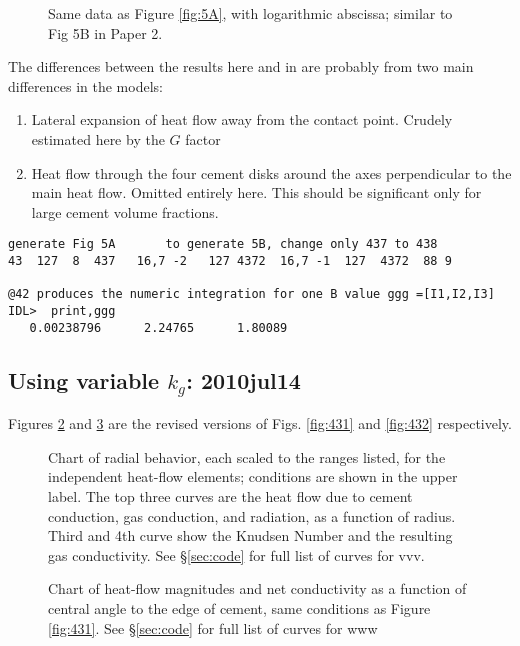 \documentclass{article}
\begin{document}
\begin{figure}[!h] 
\caption{Same data as Figure \ref{fig:5A}, with logarithmic abscissa; similar to
Fig 5B in Paper 2.}
\label{fig:5B}
\end{figure}
 The differences between the results here and in \cite{Piqueux09b} are probably from two main differences in the models: \begin{enumerate}
\item Lateral expansion of heat flow away from the contact point. Crudely estimated here by the $G$ factor
\item Heat flow through the four cement disks around the axes perpendicular to the main heat flow. Omitted entirely here. This should be significant only for large cement volume fractions.
 \end{enumerate}

\begin{verbatim}
generate Fig 5A       to generate 5B, change only 437 to 438
43  127  8  437   16,7 -2   127 4372  16,7 -1  127  4372  88 9

@42 produces the numeric integration for one B value ggg =[I1,I2,I3] 
IDL>  print,ggg
   0.00238796      2.24765      1.80089
\end{verbatim}
\subsection{Using variable $k_g$: 2010jul14} %
Figures \ref{fig:431b} and \ref{fig:432b} are the revised versions of Figs.  \ref{fig:431} and \ref{fig:432} respectively.

\begin{figure}[!h] 
\caption{Chart of radial behavior, each scaled to the ranges listed, for the
independent heat-flow elements; conditions are shown in the upper label. The top
three curves are the heat flow due to cement conduction, gas conduction, and
radiation, as a function of radius. Third and 4th curve show the Knudsen Number
and the resulting gas conductivity.  See \S \ref{sec:code} for full list of
curves for vvv.}
\label{fig:431b} \end{figure}

\begin{figure}[!h] 
\caption{Chart of heat-flow magnitudes and net conductivity as a function of
central angle to the edge of cement, same conditions as Figure \ref{fig:431}.
See \S \ref{sec:code} for full list of curves for www}
\label{fig:432b} \end{figure}

\end{document}
